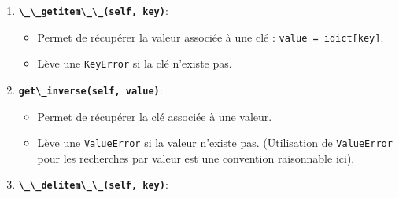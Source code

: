 \documentclass[12pt,a4paper]{report}
\newcommand{\passthrough}[1]{#1}
\providecommand{\tightlist}{%
  \setlength{\itemsep}{0pt}\setlength{\parskip}{0pt}}
\begin{document}
\begin{enumerate}
\begin{itemize}
    \begin{itemize}
    \tightlist
    \item
      Si la clé existe déjà, et la valeur est la même, ne rien faire.
    \item
      Si la clé existe déjà, et la valeur est différente :

      \begin{itemize}
      \tightlist
      \item
        Vérifier si la \emph{nouvelle} valeur existe déjà. Si oui, lever
        \passthrough{\lstinline!ValueError!}.
      \item
        Supprimer l'ancienne paire (clé, ancienne\_valeur) des deux
        dictionnaires.
      \item
        Ajouter la nouvelle paire (clé, nouvelle\_valeur) aux deux
        dictionnaires.
      \end{itemize}
    \item
      Si la clé n'existe pas :

      \begin{itemize}
      \tightlist
      \item
        Vérifier si la valeur existe déjà. Si oui, lever
        \passthrough{\lstinline!ValueError!}.
      \item
        Ajouter la nouvelle paire (clé, valeur) aux deux dictionnaires.
      \end{itemize}
    \end{itemize}
  \end{itemize}
\item
  \textbf{\passthrough{\lstinline!\_\_getitem\_\_(self, key)!}}:

  \begin{itemize}
  \tightlist
  \item
    Permet de récupérer la valeur associée à une clé :
    \passthrough{\lstinline!value = idict[key]!}.
  \item
    Lève une \passthrough{\lstinline!KeyError!} si la clé n'existe pas.
  \end{itemize}
\item
  \textbf{\passthrough{\lstinline!get\_inverse(self, value)!}}:

  \begin{itemize}
  \tightlist
  \item
    Permet de récupérer la clé associée à une valeur.
  \item
    Lève une \passthrough{\lstinline!ValueError!} si la valeur n'existe
    pas. (Utilisation de \passthrough{\lstinline!ValueError!} pour les
    recherches par valeur est une convention raisonnable ici).
  \end{itemize}
\item
  \textbf{\passthrough{\lstinline!\_\_delitem\_\_(self, key)!}}:


\end{enumerate}
\end{document}
